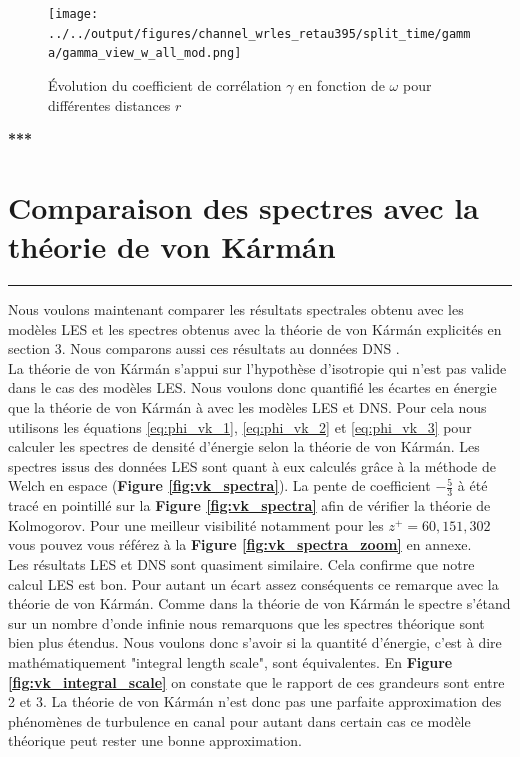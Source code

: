 \documentclass[12pt]{article}
\theoremstyle{plain}
\theoremstyle{remark}
\begin{document}
\begin{figure}[H]
	\begin{center}
		\texttt{[image: ../../output/figures/channel\_wrles\_retau395/split\_time/gamma/gamma\_view\_w\_all\_mod.png]}
		\caption{Évolution du coefficient de corrélation $\gamma$ en fonction de $\omega$ pour différentes distances $r$}
		\label{fig:gamma_w_view}
	\end{center}
\end{figure}


\begin{center}
	\large \bf{***}
\end{center}




\vspace{0.3cm}
\section{Comparaison des spectres avec la théorie de von Kármán}
\noindent\rule{\linewidth}{2pt}
\vspace{0.1cm}

Nous voulons maintenant comparer les résultats spectrales obtenu avec les modèles LES et les spectres obtenus avec la théorie de von Kármán explicités en section 3. Nous comparons aussi ces résultats au données DNS \cite{lee2015direct}. \\
La théorie de von Kármán s'appui sur l'hypothèse d'isotropie qui n'est pas valide dans le cas des modèles LES. Nous voulons donc quantifié les écartes en énergie que la théorie de von Kármán à avec les modèles LES et DNS. Pour cela nous utilisons les équations \ref{eq:phi_vk_1}, \ref{eq:phi_vk_2} et \ref{eq:phi_vk_3} pour calculer les spectres de densité d'énergie selon la théorie de von Kármán. Les spectres issus des données LES sont quant à eux calculés grâce à la méthode de Welch en espace ({\bf Figure \ref{fig:vk_spectra}}). La pente de coefficient $-\frac{5}{3}$ à été tracé en pointillé sur la {\bf Figure \ref{fig:vk_spectra}} afin de vérifier la théorie de Kolmogorov. Pour une meilleur visibilité notamment pour les $z^+=60, 151, 302$ vous pouvez vous référez à la {\bf Figure \ref{fig:vk_spectra_zoom}} en annexe. \\

Les résultats LES et DNS sont quasiment similaire. Cela confirme que notre calcul LES est bon. Pour autant un écart assez conséquents ce remarque avec la théorie de von Kármán. Comme dans la théorie de von Kármán le spectre s'étand sur un nombre d'onde infinie nous remarquons que les spectres théorique sont bien plus étendus. Nous voulons donc s'avoir si la quantité d'énergie, c'est à dire mathématiquement "integral length scale", sont équivalentes. En {\bf Figure \ref{fig:vk_integral_scale}} on constate que le rapport de ces grandeurs sont entre 2 et 3. La théorie de von Kármán n'est donc pas une parfaite approximation des phénomènes de turbulence en canal pour autant dans certain cas ce modèle théorique peut rester une bonne approximation. 
	
\end{document}
